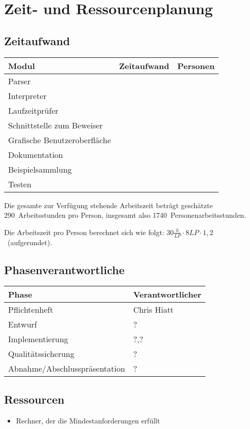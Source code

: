 \section{Zeit- und Ressourcenplanung}%

\subsection{Zeitaufwand}%

  \begin{tabular}{| l | l | l | }
    \hline
    \textbf{Modul} & \textbf{Zeitaufwand} & \textbf{Personen} \\ \hline
    Parser &  &  \\ \hline
    Interpreter &  &  \\ \hline
    Laufzeitprüfer &  &  \\ \hline
    Schnittstelle zum Beweiser &  &  \\ \hline
    Grafische Benutzeroberfläche &  &  \\ \hline
    Dokumentation &  &  \\ \hline
    Beispielsammlung &  &  \\ \hline
    Testen &  &  \\ \hline %
  \end{tabular}

Die gesamte zur Verfügung stehende Arbeitszeit beträgt geschätzte 290~Arbeitsstunden pro Person, insgesamt also 1740~Personenarbeitsstunden.

Die Arbeitszeit pro Person berechnet sich wie folgt: $30\frac{h}{LP} \cdot 8LP \cdot 1,2$~(aufgerundet).

\subsection{Phasenverantwortliche}%

  \begin{tabular}{| l | l | }
    \hline
    \textbf{Phase} & \textbf{Verantwortlicher} \\ \hline
    Pflichtenheft & Chris Hiatt \\ \hline
    Entwurf & ? \\ \hline
    Implementierung & ?,? \\ \hline
    Qualitätssicherung & ? \\ \hline
    Abnahme/Abschlusspräsentation & ? \\ \hline
  \end{tabular}

\subsection{Ressourcen}%

\begin{itemize}%
    \item Rechner, der die Mindestanforderungen erfüllt
\end{itemize}%
